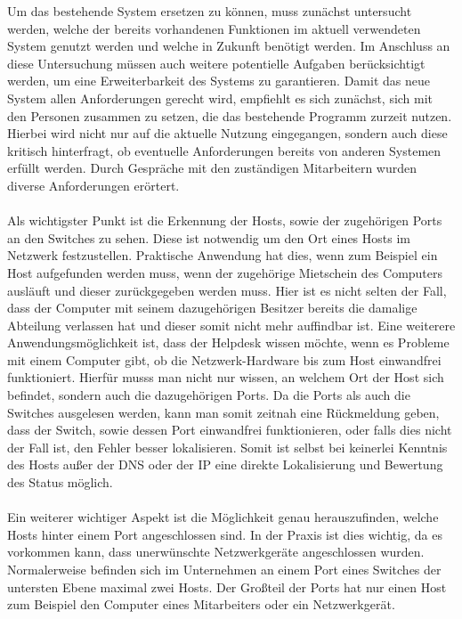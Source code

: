 Um das bestehende System ersetzen zu können, muss zunächst untersucht werden, welche der bereits vorhandenen Funktionen im aktuell verwendeten System genutzt werden und welche in Zukunft benötigt werden.
Im Anschluss an diese Untersuchung müssen auch weitere potentielle Aufgaben berücksichtigt werden, um eine Erweiterbarkeit des Systems zu garantieren.
Damit das neue System allen Anforderungen gerecht wird, empfiehlt es sich zunächst, sich mit den Personen zusammen zu setzen, die das bestehende Programm zurzeit nutzen.\\
Hierbei wird nicht nur auf die aktuelle Nutzung eingegangen, sondern auch diese kritisch hinterfragt, ob eventuelle Anforderungen bereits von anderen Systemen erfüllt werden.
Durch Gespräche mit den zuständigen Mitarbeitern wurden diverse Anforderungen erörtert.\\\\
Als wichtigster Punkt ist die Erkennung der Hosts, sowie der zugehörigen Ports an den Switches zu sehen.
Diese ist notwendig um den Ort eines Hosts im Netzwerk festzustellen. Praktische Anwendung hat dies, wenn zum Beispiel ein Host aufgefunden werden muss, wenn der zugehörige Mietschein des Computers ausläuft und dieser zurückgegeben werden muss.
Hier ist es nicht selten der Fall, dass der Computer mit seinem dazugehörigen Besitzer bereits die damalige Abteilung verlassen hat und dieser somit nicht mehr auffindbar ist.
Eine weiterere Anwendungsmöglichkeit ist, dass der Helpdesk wissen möchte, wenn es Probleme mit einem Computer gibt, ob die Netzwerk-Hardware bis zum Host einwandfrei funktioniert. Hierfür musss man nicht nur wissen, an welchem Ort der Host sich befindet, sondern auch die dazugehörigen Ports.
Da die Ports als auch die Switches ausgelesen werden, kann man somit zeitnah eine Rückmeldung geben, dass der Switch, sowie dessen Port einwandfrei funktionieren, oder falls dies nicht der Fall ist, den Fehler besser lokalisieren. Somit ist selbst bei keinerlei Kenntnis des Hosts außer der DNS oder der IP eine direkte Lokalisierung und Bewertung des Status möglich.\\\\
Ein weiterer wichtiger Aspekt ist die Möglichkeit genau herauszufinden, welche Hosts hinter einem Port angeschlossen sind.
In der Praxis ist dies wichtig, da es vorkommen kann, dass unerwünschte Netzwerkgeräte angeschlossen wurden.
Normalerweise befinden sich im Unternehmen an einem Port eines Switches der untersten Ebene maximal zwei Hosts. Der Großteil der Ports hat nur einen Host zum Beispiel den Computer eines Mitarbeiters oder ein Netzwerkgerät.
